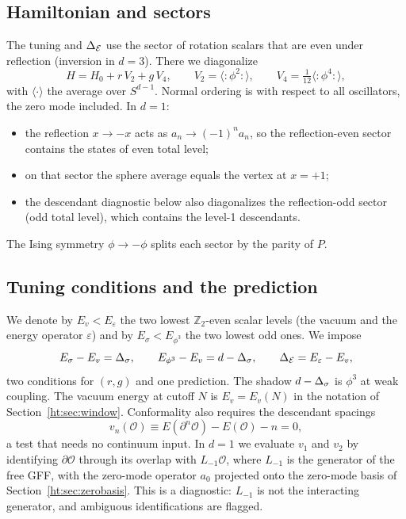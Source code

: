 \subsection{Hamiltonian and sectors}
The tuning and $\Delta_{\mathcal E}$ use the sector of rotation scalars that are even under reflection (inversion in $d=3$). There
we diagonalize
\begin{equation}
 H=H_0+r\,V_2+g\,V_4,\qquad V_2=\big\langle{:}\phi^2{:}\big\rangle,\qquad V_4=\tfrac1{12}\big\langle{:}\phi^4{:}\big\rangle,
 \label{ht:eq:H}
\end{equation}
with $\langle\cdot\rangle$ the average over $S^{d-1}$. Normal ordering is with respect to all oscillators, the zero
mode included. In $d=1$:
\begin{itemize}
\item the reflection $x\to-x$ acts as $a_n\to(-1)^na_n$, so the reflection-even sector contains the states of even
 total level;
\item on that sector the sphere average equals the vertex at $x=+1$;
\item the descendant diagnostic below also diagonalizes the reflection-odd sector (odd total level), which contains
 the level-1 descendants.
\end{itemize}
The Ising symmetry $\phi\to-\phi$ splits each sector by the parity of $P$.

\subsection{Tuning conditions and the prediction}
We denote by $E_v<E_\varepsilon$ the two lowest $\mathbb Z_2$-even scalar levels (the vacuum and the energy operator
$\varepsilon$) and by $E_\sigma<E_{\phi^3}$ the two lowest odd ones. We impose
\begin{equation}
 E_\sigma-E_v=\Delta_\sigma,\qquad E_{\phi^3}-E_v=d-\Delta_\sigma,\qquad\Delta_{\mathcal E}=E_\varepsilon-E_v ,
 \label{ht:eq:tune}
\end{equation}
two conditions for $(r,g)$ and one prediction. The shadow $d-\Delta_\sigma$ is $\phi^3$ at weak coupling. The vacuum energy
at cutoff $N$ is $E_v=E_v(N)$ in the notation of Section~\ref{ht:sec:window}. Conformality also
requires the descendant spacings
\begin{equation}
 v_n(\mathcal O)\equiv E(\partial^n\mathcal O)-E(\mathcal O)-n=0 ,
 \label{ht:eq:v}
\end{equation}
a test that needs no continuum input. In $d=1$ we evaluate $v_1$ and $v_2$ by identifying $\partial\mathcal O$
through its overlap with $L_{-1}\mathcal O$, where $L_{-1}$ is the generator of the free GFF, with the zero-mode
operator $a_0$ projected onto the zero-mode basis of Section~\ref{ht:sec:zerobasis}.
This is a diagnostic: $L_{-1}$ is not the interacting generator, and ambiguous identifications are flagged.


